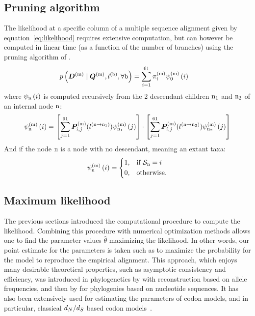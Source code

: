 \subsection{Pruning algorithm}
The \gls{likelihood} at a specific column of a multiple sequence alignment given by equation~\ref{eq:likelihood} requires extensive computation, but can however be computed in linear time (as a function of the number of branches) using the pruning algorithm of \citet{Felsenstein1981}.
\begin{align}
    p\left(\bm{D}^{(\text{m})} \mid \bm{Q}^{(\text{m})}, l^{(\text{b})}, \forall \text{b} \right) & = \sum\limits_{{i}=1}^{61} \pi^{(\text{m})}_{{i}} \psi^{(\text{m})}_{0} \left( {i} \right)
\end{align}
where $\psi_{\text{n}} \left( {i} \right)$ is computed recursively from the $2$ descendant children $\text{n}_{1}$ and $\text{n}_{2}$ of an internal node $\text{n}$:
\begin{align}
    \psi^{(\text{m})}_{\text{n}} \left( {i} \right) =
    \left[ \sum\limits_{{j}=1}^{61}\bm{P}^{(\text{m})}_{{i}, {j}}(l^{(\text{n} \to \text{n}_{1})}) \psi^{(\text{m})}_{\text{n}_{1}} \left( {j} \right) \right]
    \cdot
    \left[ \sum\limits_{{j}=1}^{61}\bm{P}^{(\text{m})}_{{i}, {j}}(l^{(\text{n} \to \text{n}_{2})}) \psi^{(\text{m})}_{\text{n}_{2}} \left( {j} \right) \right]
\end{align}
And if the node $\text{n}$ is a node with no descendant, meaning an extant taxa:
\begin{align}
    \psi^{(\text{m})}_{\text{n}} \left( {i} \right) =
    \begin{dcases}
        1, & \text{if } \mathcal{S}_{\text{n}} = {i} \\
        0, & \text{otherwise.}
    \end{dcases}
\end{align}

\subsection{Maximum likelihood}

The previous sections introduced the computational procedure to compute the likelihood.
Combining this procedure with numerical optimization methods allows one to find the parameter values $\widehat{\theta}$ maximizing the likelihood.
In other words, our point estimate for the parameters is taken such as to maximize the probability for the model to reproduce the empirical alignment.
This approach, which enjoys many desirable theoretical properties, such as asymptotic consistency and efficiency, was introduced in phylogenetics by \citet{Cavalli-Sforza1967} with reconstruction based on allele frequencies, and then by \citet{Felsenstein1981} for phylogenies based on nucleotide sequences.
It has also been extensively used for estimating the parameters of codon models, and in particular, classical $d_N / d_S$ based codon models~\citep{Yang1997a,Pond2005,Dutheil2006,Yang2007,Gueguen2013,KosakovskyPond2020}.


